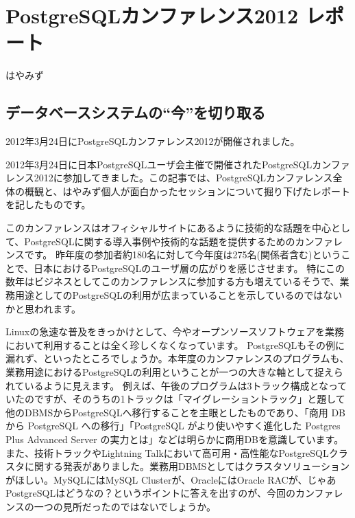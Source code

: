 
\chapter{PostgreSQLカンファレンス2012 レポート}

\begin{flushright}
 {\headfont はやみず}
\end{flushright}

\section{データベースシステムの``今''を切り取る}

2012年3月24日にPostgreSQLカンファレンス2012が開催されました。


2012年3月24日に日本PostgreSQLユーザ会主催で開催されたPostgreSQLカンファレンス2012に参加してきました。この記事では、PostgreSQLカンファレンス全体の概観と、はやみず個人が面白かったセッションについて掘り下げたレポートを記したものです。

このカンファレンスはオフィシャルサイトにあるように技術的な話題を中心として、PostgreSQLに関する導入事例や技術的な話題を提供するためのカンファレンスです。 昨年度の参加者約180名に対して今年度は275名(関係者含む)ということで、日本におけるPostgreSQLのユーザ層の広がりを感じさせます。 特にこの数年はビジネスとしてこのカンファレンスに参加する方も増えているそうで、業務用途としてのPostgreSQLの利用が広まっていることを示しているのではないかと思われます。

Linuxの急速な普及をきっかけとして、今やオープンソースソフトウェアを業務において利用することは全く珍しくなくなっています。 PostgreSQLもその例に漏れず、といったところでしょうか。本年度のカンファレンスのプログラムも、業務用途におけるPostgreSQLの利用ということが一つの大きな軸として捉えられているように見えます。 例えば、午後のプログラムは3トラック構成となっていたのですが、そのうちの1トラックは「マイグレーショントラック」と題して他のDBMSからPostgreSQLへ移行することを主眼としたものであり、「商用 DB から PostgreSQL への移行」「PostgreSQL がより使いやすく進化した Postgres Plus Advanced Server の実力とは」などは明らかに商用DBを意識しています。また、技術トラックやLightning Talkにおいて高可用・高性能なPostgreSQLクラスタに関する発表がありました。業務用DBMSとしてはクラスタソリューションがほしい。MySQLにはMySQL Clusterが、OracleにはOracle RACが、じゃあPostgreSQLはどうなの？というポイントに答えを出すのが、今回のカンファレンスの一つの見所だったのではないでしょうか。

